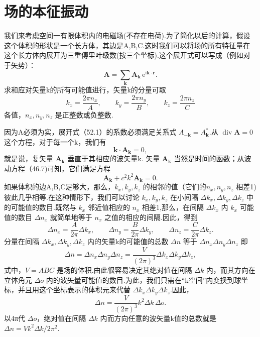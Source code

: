 \section{场的本征振动}

我们来考虑空间一有限体积内的电磁场(不存在电荷).为了简化以后的计算，假设这个体积的形状是一个长方体，其边是A,B,C.这时我们可以将场的所有特征量在这个长方体内展开为三重傅里叶级数(按三个坐标).这个展开式可以写成（例如对于矢势）：
\begin{equation}
  \boldsymbol{A}=\sum_{\boldsymbol{k}}\boldsymbol{A}_{\boldsymbol{k}}\,
  \mathrm{e}^{\mathrm{i}\boldsymbol{k}\cdot\boldsymbol{r}}.
\end{equation}
求和应对矢量k的所有可能值进行，矢量k的分量可取
\begin{equation}
  k_x=\frac{2\pi n_x}{A},\qquad
  k_y=\frac{2\pi n_y}{B},\qquad
  k_z=\frac{2\pi n_z}{C}
\end{equation}
各值，$n_x,n_y,n_z$ 是正整数或负整数.

因为A必须为实，展开式（52.1）的系数必须满足关系式 $A_{-\boldsymbol{k}} = A_{\boldsymbol{k}}^*$.从 $\operatorname{div}\boldsymbol{A} = 0$ 这个方程，对于每一个k，我们有
\begin{equation}
  \boldsymbol{k}\cdot\boldsymbol{A}_{\boldsymbol{k}}=0,
\end{equation}
就是说，复矢量 $\boldsymbol{A}_{\boldsymbol{k}}$ 垂直于其相应的波矢量k. 矢量 $\boldsymbol{A}_{\boldsymbol{k}}$ 当然是时间的函数；从波动方程（46.7)可知，它们满足方程
\begin{equation}
  \ddot{\boldsymbol{A}}_{\boldsymbol{k}}+c^2k^2\boldsymbol{A}_{\boldsymbol{k}}=0.
\end{equation}
如果体积的边A,B,C足够大，那么，$k_x,k_y,k_z$ 的相邻的值（它们的$n_x,n_y,n_z$ 相差1)彼此几乎相等.在这种情形下，我们可以讨论 $k_x,k_y,k_z$ 在小间隔 $\Delta k_x,\Delta k_y,\Delta k_z$ 中的可能值的数目.既然与 $k_x$ 邻近值相应的 $n_x$ 相差1,那么，在间隔 $\Delta k_x$ 内 $k_x$ 可能值的数目 $\Delta n_x$ 就简单地等于 $n_x$ 之值的相应的间隔.因此，得到
\begin{equation*}
  \Delta n_x=\frac{A}{2\pi}\Delta k_x,\qquad
  \Delta n_y=\frac{B}{2\pi}\Delta k_y,\qquad
  \Delta n_z=\frac{C}{2\pi}\Delta k_z.
\end{equation*}
分量在间隔 $\Delta k_x,\Delta k_y,\Delta k_z$ 内的矢量k的可能值的总数 $\Delta n$ 等于 $\Delta n_x\Delta n_y\Delta n_z$ 即
\begin{equation}
  \Delta n=\Delta n_x\Delta n_y\Delta n_z
  =\frac{V}{(2\pi)^3}\Delta k_x\Delta k_y\Delta k_z,
\end{equation}
式中，$V = ABC$ 是场的体积.由此很容易决定其绝对值在间隔 $\Delta k$ 内，而其方向在立体角元 $\Delta o$ 内的波矢量可能值的数目.为此，我们只需在“k空间”内变换到球坐标，并且用这个坐标表示的体积元来代替 $\Delta k_x\Delta k_y\Delta k_z$.因此，
\begin{equation}
  \Delta n=\frac{V}{(2\pi)^3}k^2\Delta k\,\Delta o.
\end{equation}
以4π代 $\Delta o$，绝对值在间隔 $\Delta k$ 内而方向任意的波矢量k值的总数就是 $\Delta n = Vk^2\Delta k/2\pi^2$.


